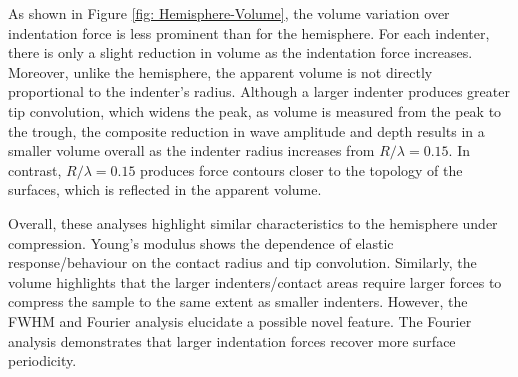 As shown in Figure \ref{fig: Hemisphere-Volume}, the volume variation over indentation force is less prominent than for the hemisphere. For each indenter, there is only a slight reduction in volume as the indentation force increases. Moreover, unlike the hemisphere, the apparent volume is not directly proportional to the indenter's radius. Although a larger indenter produces greater tip convolution, which widens the peak, as volume is measured from the peak to the trough, the composite reduction in wave amplitude and depth results in a smaller volume overall as the indenter radius increases from $R/\lambda =0.15$. In contrast, $R/\lambda =0.15$ produces force contours closer to the topology of the surfaces, which is reflected in the apparent volume. 

Overall, these analyses highlight similar characteristics to the hemisphere under compression. Young's modulus shows the dependence of elastic response/behaviour on the contact radius and tip convolution. Similarly, the volume highlights that the larger indenters/contact areas require larger forces to compress the sample to the same extent as smaller indenters. However, the FWHM and Fourier analysis elucidate a possible novel feature. The Fourier analysis demonstrates that larger indentation forces recover more surface periodicity.